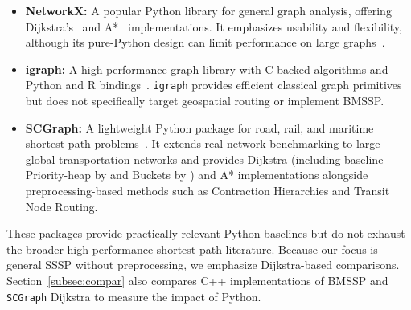 \documentclass[ijoc,blindrev]{informs3} %
\begin{document}
\begin{itemize}

\item \textbf{NetworkX:} A popular Python library for general graph analysis, offering Dijkstra's~\citep{dijkstra1959note} and A*~\citep{hart1968formal} implementations. It emphasizes usability and flexibility, although its pure-Python design can limit performance on large graphs~\citep{hagberg2008exploring}.

\item \textbf{igraph:} A high-performance graph library with C-backed algorithms and Python and R bindings~\citep{csardi2006igraph}. \texttt{igraph} provides efficient classical graph primitives but does not specifically target geospatial routing or implement BMSSP.

\item \textbf{SCGraph:} {\color{blue}A lightweight Python package for road, rail, and maritime shortest-path problems~\citep{makowski2025scgraph}. It extends real-network benchmarking to large global transportation networks and provides Dijkstra (including baseline Priority-heap by \cite{chen2007priority} and Buckets by \cite{dial1969buckets}) and A* implementations alongside preprocessing-based methods such as Contraction Hierarchies and Transit Node Routing.}

\end{itemize}

{\color{blue}
These packages provide practically relevant Python baselines but do not exhaust the broader high-performance shortest-path literature. Because our focus is general SSSP without preprocessing, we emphasize Dijkstra-based comparisons. Section~\ref{subsec:compar} also compares C++ implementations of BMSSP and \texttt{SCGraph} Dijkstra to measure the impact of Python.}
\end{document}
